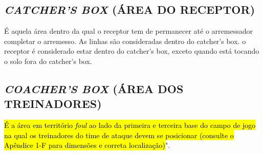 \subsection{\textit{CATCHER'S BOX} (ÁREA DO RECEPTOR)}
É aquela área dentro da qual o receptor tem de permanecer até o arremessador completar o arremesso. As linhas são consideradas dentro do \gls{catcher's box}. o receptor é considerado estar dentro do \gls{catcher's box}, exceto quando está tocando o solo fora do \gls{catcher's box}.

\subsection{\textit{COACHER'S BOX} (ÁREA DOS TREINADORES)}
\hl{\'E a \'area em territ\'orio \textit{foul} ao lado da primeira e terceira base do campo de jogo na qual os treinadores do time de ataque devem se posicionar (consulte o Ap\^endice 1-F para dimens\~oes e correta localiza\c{c}\~ao)}".

